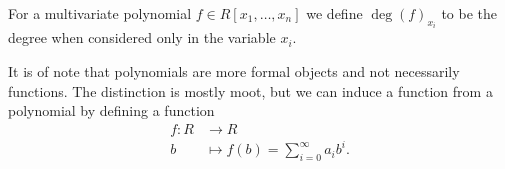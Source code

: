 \begin{definition}
	For a multivariate polynomial \(f \in R\left[ x_1, \ldots, x_{n} \right] \) we define \(\deg \left(  f \right) _{x_{i}}\) to be the degree when considered only in the variable \(x_{i}\).
\end{definition}
\begin{remark}
	It is of note that polynomials are more formal objects and not necessarily functions. The distinction is mostly moot, but we can induce a function from a polynomial by defining a function \begin{align*}
		f: R &\longrightarrow R \\
		b &\longmapsto f(b) = \sum_{i=0}^{\infty} a_{i}b^{i}
	.\end{align*}
\end{remark}
